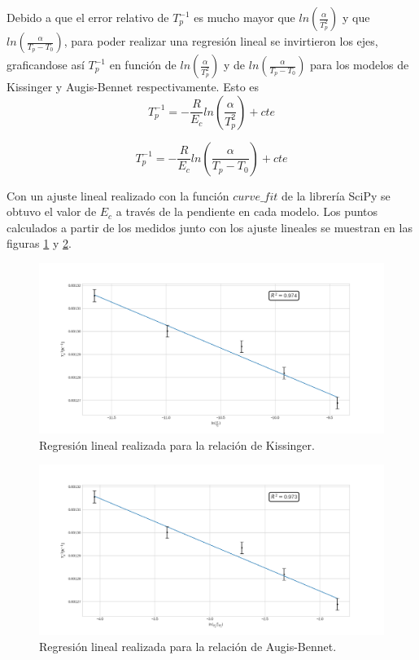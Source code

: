 \documentclass[12pt]{article}
\theoremstyle{definition}
\theoremstyle{remark}
\begin{document}
Debido a que el error relativo de $T_p^{-1}$ es mucho mayor que $ln(\frac{\alpha}{T_p^2})$ y que $ln(\frac{\alpha}{T_p-T_0})$, para poder realizar una regresión lineal se invirtieron los ejes, graficandose así $T_p^{-1}$ en función de $ln(\frac{\alpha}{T_p^2})$ y de $ln(\frac{\alpha}{T_p-T_0})$ para los modelos de Kissinger y Augis-Bennet respectivamente. Esto es
\begin{equation}
	T_p^{-1}=-\frac{R}{E_c}ln(\frac{\alpha}{T_p^2})+cte
\end{equation}

\begin{equation}
	T_p^{-1}=-\frac{R}{E_c}ln(\frac{\alpha}{T_p-T_0})+cte
\end{equation}

Con un ajuste lineal realizado con la función $curve\_fit$ de la librería SciPy se obtuvo el valor de $E_c$ a través de la pendiente en cada modelo. Los puntos calculados a partir de los medidos junto con los ajuste lineales se muestran en las figuras \ref{Kiss} y \ref{AugBen}.


\begin{figure}[H]
 	\centering
	\includegraphics[scale=0.4]{img/Kissinger.png}
 	\caption{Regresión lineal realizada para la relación de Kissinger.}
	\label{Kiss}
\end{figure} 

 \begin{figure}[H]
 	\centering
	\includegraphics[scale=0.4]{img/Augis_bennet.png}
 	\caption{Regresión lineal realizada para la relación de Augis-Bennet.}
	\label{AugBen}
\end{figure} 
\end{document}
